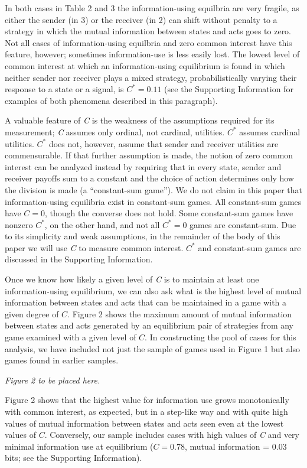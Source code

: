 \documentclass[10pt]{article}
\begin{document}
In both cases in Table 2 and 3 the information-using equilbria are very
fragile, as either the sender (in 3) or the receiver (in 2) can shift
without penalty to a strategy in which the mutual information between
states and acts goes to zero. Not all cases of information-using
equilbria and zero common interest have this feature, however; sometimes
information-use is less easily lost. The lowest level of common interest
at which an information-using equilibrium is found in which neither
sender nor receiver plays a mixed strategy, probabilistically varying
their response to a state or a signal, is $C^*=0.11$ (see the Supporting
Information for examples of both phenomena described in this paragraph).

A valuable feature of \emph{C} is the weakness of the assumptions
required for its measurement; \emph{C} assumes only ordinal, not
cardinal, utilities. $C^*$ assumes cardinal utilities. $C^*$ does not,
however, assume that sender and receiver utilities are commensurable. If
that further assumption is made, the notion of zero common interest can
be analyzed instead by requiring that in every state, sender and
receiver payoffs sum to a constant and the choice of action determines
only how the division is made (a ``constant-sum game''). We do not claim
in this paper that information-using equilibria exist in constant-sum
games. All constant-sum games have $C=0$, though the converse does not
hold. Some constant-sum games have nonzero $C^*$, on the other hand, and
not all $C^*=0$ games are constant-sum. Due to its simplicity and weak
assumptions, in the remainder of the body of this paper we will use
\emph{C} to measure common interest. $C^*$ and constant-sum games are
discussed in the Supporting Information.

Once we know how likely a given level of \emph{C} is to maintain at
least one information-using equilibrium, we can also ask what is the
highest level of mutual information between states and acts that can be
maintained in a game with a given degree of $C$. Figure 2 shows the
maximum amount of mutual information between states and acts generated
by an equilibrium pair of strategies from any game examined with a given
level of $C$. In constructing the pool of cases for this analysis, we have
included not just the sample of games used in Figure 1 but also games
found in earlier samples.

\emph{Figure 2 to be placed here.}

Figure 2 shows that the highest value for information use grows
monotonically with common interest, as expected, but in a step-like way
and with quite high values of mutual information between states and acts
seen even at the lowest values of $C$. Conversely, our sample includes
cases with high values of \emph{C} and very minimal information use at
equilibrium ($C=0.78$, mutual information = 0.03 bits; see the
Supporting Information).
\end{document}
